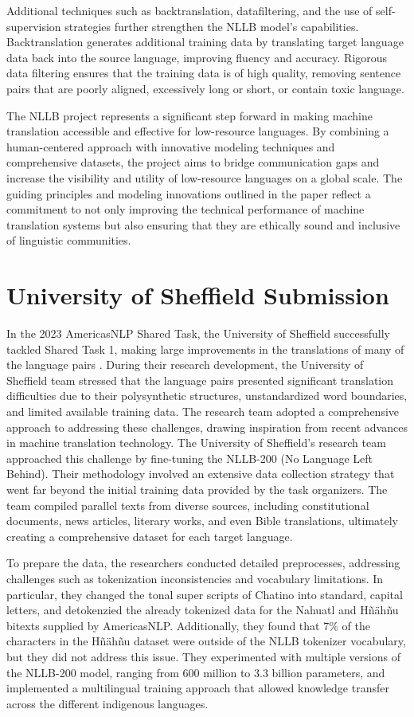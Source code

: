 Additional techniques such as backtranslation, datafiltering, and the use of self-supervision strategies further strengthen the NLLB model’s capabilities. Backtranslation generates additional training data by translating target language data back into the source language, improving fluency and accuracy. Rigorous data filtering ensures that the training data is of high quality, removing sentence pairs that are poorly aligned, excessively long or short, or contain toxic language.

The NLLB project represents a significant step forward in making machine translation accessible and effective for low-resource languages. By combining a human-centered approach with innovative modeling techniques and comprehensive datasets, the project aims to bridge communication gaps and increase the visibility and utility of low-resource languages on a global scale. The guiding principles and modeling innovations outlined in the paper reflect a commitment to not only improving the technical performance of machine translation systems but also ensuring that they are ethically sound and inclusive of linguistic communities.

\section{University of Sheffield Submission}
In the 2023 AmericasNLP Shared Task, the University of Sheffield successfully tackled Shared Task 1, making large improvements in the translations of many of the language pairs \cite{gow-smith-snchez-villegas-2023-sheffields}. During their research development, the University of Sheffield team stressed that the language pairs presented significant translation difficulties due to their polysynthetic structures, unstandardized word boundaries, and limited available training data. The research team adopted a comprehensive approach to addressing these challenges, drawing inspiration from recent advances in machine translation technology. The University of Sheffield's research team approached this challenge by fine-tuning the NLLB-200 (No Language Left Behind). Their methodology involved an extensive data collection strategy that went far beyond the initial training data provided by the task organizers. The team compiled parallel texts from diverse sources, including constitutional documents, news articles, literary works, and even Bible translations, ultimately creating a comprehensive dataset for each target language.

To prepare the data, the researchers conducted detailed preprocesses, addressing challenges such as tokenization inconsistencies and vocabulary limitations. In particular, they changed the tonal super scripts of Chatino into standard, capital letters, and detokenzied the already tokenized data for the Nahuatl and Hñähñu bitexts supplied by AmericasNLP. Additionally, they found that 7\% of the characters in the Hñähñu dataset were outside of the NLLB tokenizer vocabulary, but they did not address this issue. They experimented with multiple versions of the NLLB-200 model, ranging from 600 million to 3.3 billion parameters, and implemented a multilingual training approach that allowed knowledge transfer across the different indigenous languages.

